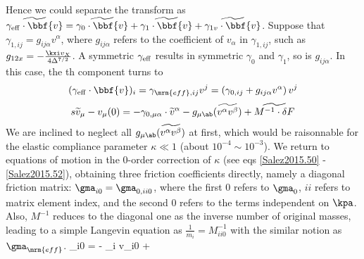 Hence we could separate the transform as $\widetilde{\gamma_{\rm{eff}} \cdot \bbf{v}} = \widetilde{\gamma_0 \cdot \bbf{v}} + \widetilde{\gamma_1 \cdot \bbf{v}} + \widetilde{\gamma_{1v} \cdot \bbf{v}}$. Suppose that $\gamma_{1,ij} = g_{ij\alpha} v^\alpha$, where $g_{ij\alpha}$ refers to the coefficient of $v_\alpha$ in $\gamma_{1,ij}$, such as $g_{12x} = -\frac{\kxi v_X}{4 \Delta^{7/2}}$. A symmetric $\gamma_{\rm{eff}}$ results in symmetric $\gamma_0$ and $\gamma_1$, so is $g_{ij\alpha}$. In this case, the th component turns to
$$ (\gamma_{\rm{eff}} \cdot \bbf{v})_i = \gamma_{\mrm{eff},ij} v^j = \left( \gamma_{0,ij} + g_{ij\alpha} v^\alpha \right) v^j $$
$$ s \widetilde{v}_\mu - v_\mu (0) = -\gamma_{0,\mu\alpha} \cdot \widetilde{v}^\alpha - g_{\mu\ab} (\widetilde{v^\alpha v^\beta}) + \widetilde{M^{-1} \cdot \delta F} $$
We are inclined to neglect all $g_{\mu\ab} (\widetilde{v^\alpha v^\beta})$ at first, which would be raisonnable for the elastic compliance parameter $\kappa \ll 1$ (about $10^{-4} \sim 10^{-3}$). We return to equations of motion in the 0-order correction of $\kappa$ (see eqs \ref{Salez2015.50} - \ref{Salez2015.52}), obtaining three friction coefficients directly, namely  a diagonal friction matrix: $\gma_{i0} = \gma_{0,ii0}$, where the first 0 refers to $\gma_0$, $ii$ refers to matrix element index, and the second 0 refers to the terms independent on $\kpa$.
Also, $M^{-1}$ reduces to the diagonal one as the inverse number of original masses, leading to a simple Langevin equation as $\frac{1}{m_i} = M^{-1}_{ii0}$ with the similar notion as $\gma_{\mrm{eff}}$.
\beq {}_{i0} = - \gamma_{i} v_{i0} +  \label{Yilin.28} \eeq
